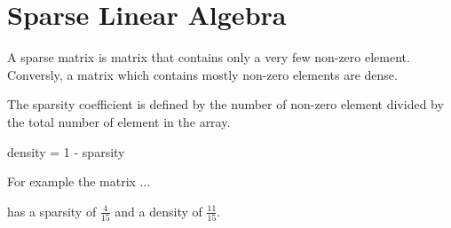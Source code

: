 \chapter{Sparse Linear Algebra}

A sparse matrix is matrix that contains only a very few non-zero element. Conversly, a matrix which contains mostly non-zero elements are dense.

The sparsity coefficient is defined by the number of non-zero element divided by the total number of element in the array.

density = 1 - sparsity

For example the matrix 
...

has a sparsity of $\frac{4}{15}$ and a density of $\frac{11}{15}$.